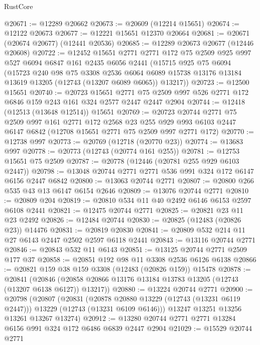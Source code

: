 \begin{lexlean}{RustCore}
\begin{coremodule}
@20671 := @12289 @20662
@20673 := @20609 (@12214 @15651)
@20674 := @12122 @20673
@20677 := @12221 @15651 @12370 @20664
@20681 := @20671 (@20674 @20677) (@12441 @20536)
@20685 := @12289 @20673 @20677 (@12446 @20608)
@20722 := @12452
    @15651
    @2771
    @2771
    @172
    @75
    @2509
    @925
    @997
    @527
    @6094
    @6847
    @161
    @2435
    @6056
    @2441
    (@15715
      @925
      @75
      @6094
      (@15723
        @240
        @98
        @75
        @3308
        @2536
        @6064
        @6089
        @15738
        @13176
        @13184
        @13619
        @13205
        (@12743 (@13207 @6089 @6065))
        @13217))
@20723 := @12500 @15651
@20740 := @20723
    @15651
    @2771
    @75
    @2509
    @997
    @526
    @2771
    @172
    @6846
    @159
    @243
    @161
    @324
    @2577
    @2447
    @2447
    @2904
@20744 := @12418 (@12513 (@13648 @12514)) @15651
@20769 := @20723
    @20744
    @2771
    @75
    @2509
    @997
    @161
    @2771
    @172
    @2568
    @23
    @255
    @929
    @993
    @6103
    @2447
    @6147
    @6842
    (@12708 @15651 @2771 @75 @2509 @997 @2771 @172)
@20770 := @12738 @997
@20773 := @20769 (@12718 (@20770 @23))
@20774 := @13683 @997
@20778 := @20773 (@12743 (@20774 @161 @255))
@20781 := @12753 @15651 @75 @2509
@20787 := @20778 (@12446 (@20781 @255 @929 @6103 @2447))
@20798 := @13048 @20744 @2771 @2771 @536 @991 @324 @172 @6147 @6156 @2447 @6842
@20800 := @13063 @20744 @2771
@20807 := @20800 @266 @535 @43 @13 @6147 @6154 @2646
@20809 := @13076 @20744 @2771
@20810 := @20809 @204
@20819 := @20810 @534 @11 @40 @2492 @6146 @6153 @2597 @6108 @2441
@20821 := @12475 @20744 @2771
@20825 := @20821 @23 @11 @23 @2492
@20826 := @12484 @20744
@20830 := @20825 (@12483 (@20826 @23)) @14476
@20831 := @20819 @20830
@20841 := @20809 @532 @214 @11 @27 @6143 @2447 @2502 @2597 @6118 @2441
@20843 := @13116 @20744 @2771
@20846 := @20843 @532 @11 @6143
@20851 := @13125 @20744 @2771 @2509 @177 @37
@20858 := @20851 @192 @98 @11 @3308 @2536 @6126 @6138
@20866 := @20821 @159 @38 @159 @3308 (@12483 (@20826 @159)) @15478
@20878 := @20841
    (@20846 (@20858 @20866 @13176 @13184 @13783 @13205 (@12743 (@13207 @6138 @6127)) @13217))
@20880 := @13224 @20744 @2771
@20900 := @20798
    (@20807
      (@20831
        (@20878 @20880 @13229 (@12743 (@13231 @6119 @2447)))
        @13229
        (@12743 (@13231 @6109 @6146)))
      @13247
      @13251
      @13256
      @13261
      @13267
      @13274)
@20912 := @13280 @20744 @2771 @2771 @13284 @6156 @991 @324 @172 @6486 @6839 @2447 @2904
@21029 := @15529
    @20744
    @2771

\end{coremodule}
\end{lexlean}
